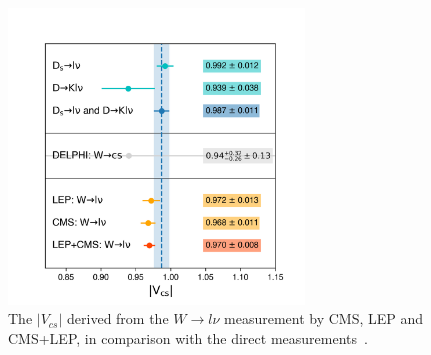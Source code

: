  \begin{figure}[!h]
    \centering
    \includegraphics[width=0.7\textwidth]{chapters/RelatedWorks/sectionVcs/figures/vcs_world_average.png}
    \caption{The $|V_{cs}|$ derived from the $W\to l\nu$ measurement by CMS, LEP and CMS+LEP, in comparison with the direct measurements~\cite{pdg2020}.}
    \label{fig:relatedWorks:vcs:measurements}
\end{figure}














